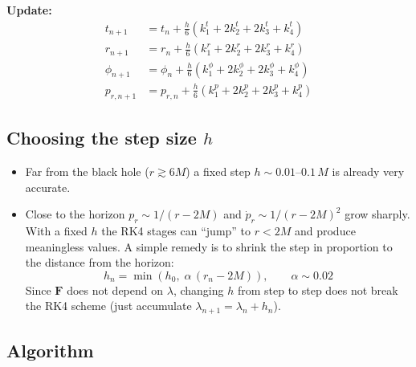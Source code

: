 \documentclass[11pt,a4paper]{article}
\begin{document}
\textbf{Update:}
\begin{align*}
    t_{n+1} &= t_n + \frac{h}{6}\left( k_1^t + 2k_2^t + 2k_3^t + k_4^t \right) \\
    r_{n+1} &= r_n + \frac{h}{6}\left( k_1^r + 2k_2^r + 2k_3^r + k_4^r \right) \\
    \phi_{n+1} &= \phi_n + \frac{h}{6}\left( k_1^\phi + 2k_2^\phi + 2k_3^\phi + k_4^\phi \right) \\
    p_{r,n+1} &= p_{r,n} + \frac{h}{6}\left( k_1^p + 2k_2^p + 2k_3^p + k_4^p \right) \tag{36}\label{eq:36}
\end{align*}

\subsection{Choosing the step size \texorpdfstring{$h$}{h}}

\begin{itemize}
  \item Far from the black hole ($r \gtrsim 6M$) a fixed step $h \sim 0.01$--$0.1\,M$ is already very accurate.
  \item Close to the horizon $p_r \sim 1/(r - 2M)$ and $\dot{p}_r \sim 1/(r - 2M)^2$ grow sharply. With a fixed $h$ the RK4 stages can ``jump'' to $r < 2M$ and produce meaningless values. A simple remedy is to shrink the step in proportion to the distance from the horizon:
  \begin{equation*}
  h_n = \min\left( h_0,\; \alpha\,(r_n - 2M) \right), \qquad \alpha \sim 0.02 \tag{37}\label{eq:37}
  \end{equation*}
  Since $\mathbf{F}$ does not depend on $\lambda$, changing $h$ from step to step does not break the RK4 scheme (just accumulate $\lambda_{n+1} = \lambda_n + h_n$).
\end{itemize}

\subsection{Algorithm}
\end{document}
